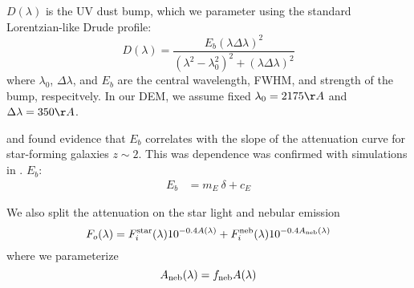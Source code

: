$D(\lambda)$ is the UV dust bump, which we
parameter using the standard Lorentzian-like Drude profile:
\begin{equation}
    D(\lambda) = \frac{E_b(\lambda \Delta \lambda)^2}{(\lambda^2 -
    \lambda_0^2)^2 + (\lambda \Delta \lambda)^2}
\end{equation}
where $\lambda_0$, $\Delta \lambda$, and $E_b$ are the central wavelength,
FWHM, and strength of the bump, respecitvely. In our DEM, we assume fixed 
$\lambda_0 = 2175 \AA$ and $\Delta \lambda = 350\AA$. 

\cite{kriek2013} and \cite{tress2018} found evidence that $E_b$ correlates with
the slope of the attenuation curve for star-forming galaxies $z\sim2$. This was
dependence was confirmed with simulations in \cite{naranyanan2018}. $E_b$: 
\begin{align}
    E_b &= m_E~\delta + c_E
\end{align}

We also split the attenuation on the star light and nebular emission 
\begin{equation} 
    F_o (\lambda) = F^{\rm star}_i (\lambda) 10^{-0.4 A(\lambda)} + F^{\rm
    neb}_i (\lambda) 10^{-0.4 A_{\rm neb}(\lambda)}
\end{equation}
where we parameterize
\begin{equation}
    A_{\rm neb}(\lambda) = f_{\rm neb}  A(\lambda) 
\end{equation} 


